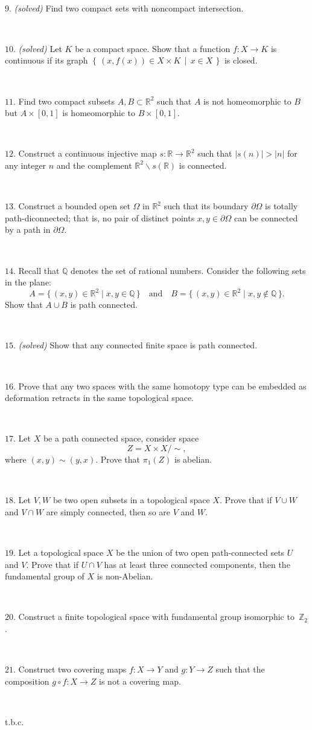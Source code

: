 \documentclass{article}
\def\noi{\noindent}%
\def\RR{\mathbb{R}}%
\def\ZZ{\mathbb{Z}}%
\def\QQ{\mathbb{Q}}%
\def\i{\subset}
\def\:{\colon}
\newcommand{\set}[2]{\left\{\,#1\,\middle|\,#2\,\right\}}
\begin{document}
\ 

\noi \sout{$9.$} \textit{(solved)} Find two compact sets with noncompact intersection.

\ 

\noi \sout{$10.$} \textit{(solved)} Let $K$ be a compact space.
Show that a function $f\:X\to K$ is continuous if its graph $\set{(x,f(x))\in X\times K}{x\in X}$ is closed. 

\ 

\noi $11$. Find two compact subsets $A,B\i\RR^2$ such that 
$A$ is not homeomorphic to $B$ but $A\times[0,1]$ is homeomorphic to $B\times[0,1]$.

\ 

\noi $12$. Construct a continuous injective map $s\:\RR\to\RR^2$ such that $|s(n)|>|n|$ for any integer $n$ and the complement $\RR^2\backslash s(\RR)$ is connected. 

\ 

\noi $13.$
Construct a bounded open set $\Omega$ in $\RR^2$
such that its boundary $\partial \Omega$ is totally path-diconnected;
that is, no pair of distinct points $x,y\in\partial \Omega$ can be connected by a path in $\partial \Omega$.

\ 

\noi $14.$
Recall that $\QQ$ denotes the set of rational numbers.
Consider the following sets in the plane:
\[A=\{\,(x,y)\in\RR^2\mid x,y\in\QQ\,\}
\quad\text{and}\quad
B=\{\,(x,y)\in\RR^2\mid x,y\notin\QQ\,\}.\]
Show that $A\cup B$ is path connected.

\ 

\noi \sout{$15.$} \textit{(solved)} Show that any connected finite space is path connected.

\ 

\noi $16.$ Prove that any two spaces with the same homotopy type 
can be embedded as
deformation retracts in the same topological space.

\ 

\noi $17.$ Let $X$ be a path connected space, consider space 
$$Z=X\times X/\sim,$$
where $(x,y)\sim(y,x)$.
Prove that $\pi_1(Z)$ is abelian.

\ 

\noi $18.$ Let $V, W$ be two open subsets in a topological space $X$. 
Prove that if
$V \cup W$ and $V \cap W$ are simply connected, then so are $V$ and $W$.

\ 

\noi $19.$ Let a topological space $X$ be the union of two open path-connected sets $U$ and $V$. 
Prove that if $U\cap V$ has at least three connected components, then the fundamental group of $X$ is non-Abelian.

\ 

\noi $20.$ Construct a finite topological space with fundamental group isomorphic to~$\ZZ_2$.

\ 

\noi $21.$ Construct two covering maps $f\:X\to Y$ and $g\:Y\to Z$ such that the composition $g\circ f\:X\to Z$ is not a covering map.

\ 

\noi t.b.c.
\end{document}
